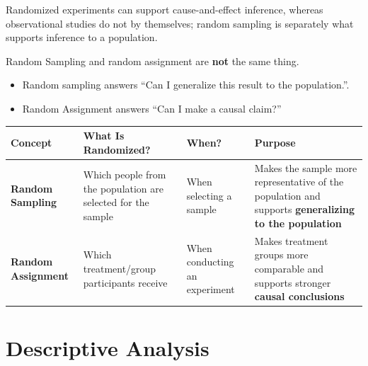 \documentclass[
  letterpaper,
  DIV=11,
  numbers=noendperiod]{scrreprt}
\newcounter{none} %
\providecommand{\tightlist}{%
  \setlength{\itemsep}{0pt}\setlength{\parskip}{0pt}}
\begin{document}
Randomized experiments can support cause-and-effect inference, whereas
observational studies do not by themselves; random sampling is
separately what supports inference to a population.

Random Sampling and random assignment are \textbf{not} the same thing.

\begin{itemize}
\tightlist
\item
  Random sampling answers ``Can I generalize this result to the
  population.''.
\item
  Random Assignment answers ``Can I make a causal claim?''
\end{itemize}

{\def\LTcaptype{none} %
\begin{longtable}[]{@{}
  >{\raggedright\arraybackslash}p{}
  >{\raggedright\arraybackslash}p{}
  >{\raggedright\arraybackslash}p{}
  >{\raggedright\arraybackslash}p{}@{}}
\toprule\noalign{}
\begin{minipage}[b]{\linewidth}\raggedright
Concept
\end{minipage} & \begin{minipage}[b]{\linewidth}\raggedright
What Is Randomized?
\end{minipage} & \begin{minipage}[b]{\linewidth}\raggedright
When?
\end{minipage} & \begin{minipage}[b]{\linewidth}\raggedright
Purpose
\end{minipage} \\
\midrule\noalign{}
\endhead
\bottomrule\noalign{}
\endlastfoot
\textbf{Random Sampling} & Which people from the population are selected
for the sample & When selecting a sample & Makes the sample more
representative of the population and supports \textbf{generalizing to
the population} \\
\textbf{Random Assignment} & Which treatment/group participants receive
& When conducting an experiment & Makes treatment groups more comparable
and supports stronger \textbf{causal conclusions} \\
\end{longtable}
}


\chapter{Descriptive Analysis}\label{descriptive-analysis}
\end{document}
